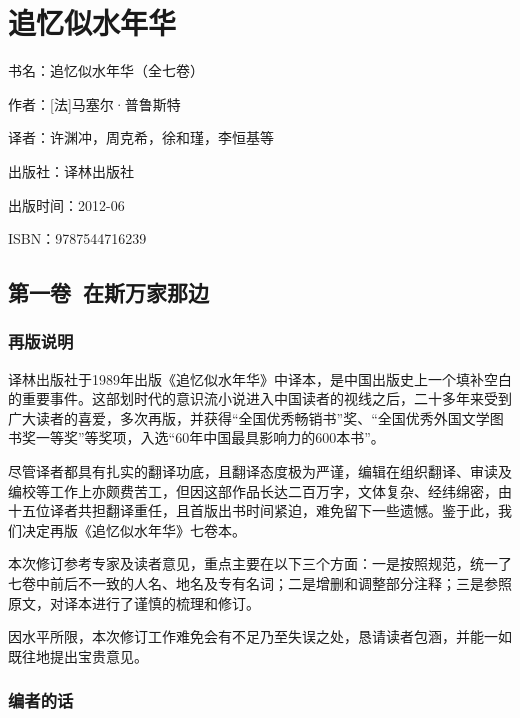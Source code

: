 



\section{追忆似水年华}


\par 书名：追忆似水年华（全七卷）
\par 作者：[法]马塞尔·普鲁斯特
\par 译者：许渊冲，周克希，徐和瑾，李恒基等
\par 出版社：译林出版社
\par 出版时间：2012-06
\par ISBN：9787544716239


\subsection{第一卷\ 在斯万家那边}


\subsubsection*{再版说明}

\par 译林出版社于1989年出版《追忆似水年华》中译本，是中国出版史上一个填补空白的重要事件。这部划时代的意识流小说进入中国读者的视线之后，二十多年来受到广大读者的喜爱，多次再版，并获得“全国优秀畅销书”奖、“全国优秀外国文学图书奖一等奖”等奖项，入选“60年中国最具影响力的600本书”。
\par 尽管译者都具有扎实的翻译功底，且翻译态度极为严谨，编辑在组织翻译、审读及编校等工作上亦颇费苦工，但因这部作品长达二百万字，文体复杂、经纬绵密，由十五位译者共担翻译重任，且首版出书时间紧迫，难免留下一些遗憾。鉴于此，我们决定再版《追忆似水年华》七卷本。
\par 本次修订参考专家及读者意见，重点主要在以下三个方面：一是按照规范，统一了七卷中前后不一致的人名、地名及专有名词；二是增删和调整部分注释；三是参照原文，对译本进行了谨慎的梳理和修订。
\par 因水平所限，本次修订工作难免会有不足乃至失误之处，恳请读者包涵，并能一如既往地提出宝贵意见。
\par {}
\par {}

\subsubsection*{编者的话}

